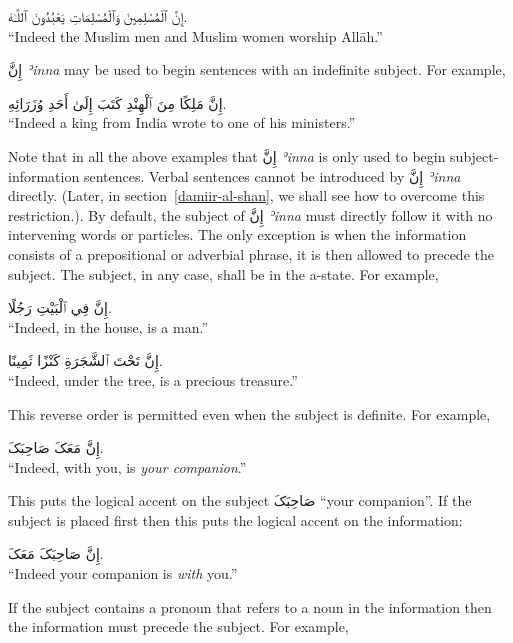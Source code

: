 \documentclass[
  10pt,
]{book}
\begin{document}
\foreignlanguage{arabic}{إِنَّ ٱلْمُسْلِمِينَ وَٱلْمُسْلِمَاتِ يَعْبُدُونَ ٱللَّـٰهَ.}\\
\enquote{Indeed the Muslim men and Muslim women worship Allāh.}

\foreignlanguage{arabic}{إِنَّ} \emph{ʾinna} may be used to begin sentences with an indefinite subject. For example,

\foreignlanguage{arabic}{إِنَّ مَلِکًا مِنَ ٱلْهِنْدِ کَتَبَ إِلَىٰ أَحَدِ وُزَرَائِهِ.}\\
\enquote{Indeed a king from India wrote to one of his ministers.}

Note that in all the above examples that
\foreignlanguage{arabic}{إِنَّ} \emph{ʾinna} is only used to begin subject-information sentences. Verbal sentences cannot be introduced by \foreignlanguage{arabic}{إِنَّ} \emph{ʾinna} directly. (Later, in section~\ref{damiir-al-shan}, we shall see how to overcome this restriction.).
By default, the subject of \foreignlanguage{arabic}{إِنَّ} \emph{ʾinna} must directly follow it with no intervening words or particles. The only exception is when the information consists of a prepositional or adverbial phrase, it is then allowed to precede the subject. The subject, in any case, shall be in the a-state. For example,

\foreignlanguage{arabic}{إِنَّ فِي ٱلْبَيْتِ رَجُلًا.}\\
\enquote{Indeed, in the house, is a man.}

\foreignlanguage{arabic}{إِنَّ تَحْتَ ٱلشَّجَرَةِ کَنْزًا ثَمِينًا.}\\
\enquote{Indeed, under the tree, is a precious treasure.}

This reverse order is permitted even when the subject is definite. For example,

\foreignlanguage{arabic}{إِنَّ مَعَکَ صَاحِبَکَ.}\\
\enquote{Indeed, with you, is \emph{your companion}.}

This puts the logical accent on the subject \foreignlanguage{arabic}{صَاحِبَکَ} \enquote{your companion}. If the subject is placed first then this puts the logical accent on the information:

\foreignlanguage{arabic}{إِنَّ صَاحِبَکَ مَعَکَ.}\\
\enquote{Indeed your companion is \emph{with} you.}

If the subject contains a pronoun that refers to a noun in the information then the information must precede the subject. For example,
\end{document}
